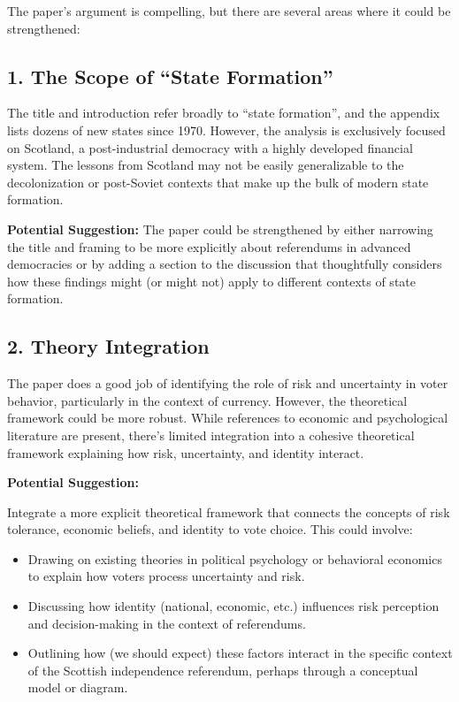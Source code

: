 \documentclass[
  letterpaper,
  DIV=11,
  numbers=noendperiod]{scrartcl}
\providecommand{\tightlist}{%
  \setlength{\itemsep}{0pt}\setlength{\parskip}{0pt}}\usepackage{longtable,booktabs,array}
\begin{document}
The paper's argument is compelling, but there are several areas where it
could be strengthened:

\subsection{1. The Scope of ``State
Formation''}\label{the-scope-of-state-formation}

The title and introduction refer broadly to ``state formation'', and the
appendix lists dozens of new states since 1970. However, the analysis is
exclusively focused on Scotland, a post-industrial democracy with a
highly developed financial system. The lessons from Scotland may not be
easily generalizable to the decolonization or post-Soviet contexts that
make up the bulk of modern state formation.

\textbf{Potential Suggestion:} The paper could be strengthened by either
narrowing the title and framing to be more explicitly about referendums
in advanced democracies or by adding a section to the discussion that
thoughtfully considers how these findings might (or might not) apply to
different contexts of state formation.

\subsection{2. Theory Integration}\label{theory-integration}

The paper does a good job of identifying the role of risk and
uncertainty in voter behavior, particularly in the context of currency.
However, the theoretical framework could be more robust. While
references to economic and psychological literature are present, there's
limited integration into a cohesive theoretical framework explaining how
risk, uncertainty, and identity interact.

\textbf{Potential Suggestion:}

Integrate a more explicit theoretical framework that connects the
concepts of risk tolerance, economic beliefs, and identity to vote
choice. This could involve:

\begin{itemize}
\tightlist
\item
  Drawing on existing theories in political psychology or behavioral
  economics to explain how voters process uncertainty and risk.
\item
  Discussing how identity (national, economic, etc.) influences risk
  perception and decision-making in the context of referendums.
\item
  Outlining how (we should expect) these factors interact in the
  specific context of the Scottish independence referendum, perhaps
  through a conceptual model or diagram.
\end{itemize}
\end{document}
